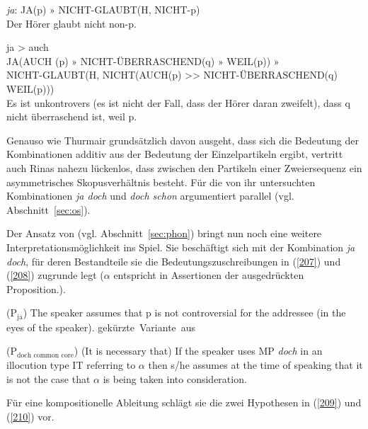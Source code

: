 \begin{exe}
	\ex\label{205} 
			\textit{ja}: JA(p) $»$ NICHT-GLAUBT(H, NICHT-p)\\
			\glq Der Hörer glaubt nicht non-p.\grq {}
\hfill\hbox{\citet[425/420]{Rinas2007}}			
\end{exe}

\begin{exe}
\ex\label{206}
	ja > auch\\
	JA(AUCH (p) $»$ NICHT-ÜBERRASCHEND(q) $»$ WEIL(p)) $»$\\
	NICHT-GLAUBT(H, NICHT(AUCH(p) >> NICHT-ÜBERRASCHEND(q) \\ WEIL(p)))\\
	\glq Es ist unkontrovers (es ist nicht der Fall, dass der Hörer daran zweifelt), dass q nicht überraschend ist, weil p.\grq {}	
	\hfill\hbox {\citet[425]{Rinas2007}}
\end{exe}
Genauso wie Thurmair grundsätzlich davon ausgeht, dass sich die Bedeutung der Kombinationen additiv aus der Bedeutung der Einzelpartikeln ergibt, vertritt auch Rinas nahezu lückenlos, dass zwischen den Partikeln einer Zweiersequenz ein asymmetrisches Skopusverhältnis besteht. Für die von ihr untersuchten Kombinationen \textit{ja doch} und \textit{doch schon} argumentiert \citet{Ormelius-Sandblom1997} paral\-lel (vgl. Abschnitt~\ref{sec:os}). 

Der Ansatz von \citet{Lindner1991} (vgl. Abschnitt~\ref{sec:phon}) bringt nun noch eine weitere Interpretationsmöglichkeit ins Spiel. Sie beschäftigt sich mit der Kombination \textit{ja doch}, für deren Bestandteile sie die Bedeutungszuschreibungen in (\ref{207}) und (\ref{208}) zugrunde legt ($\alpha$ entspricht in Assertionen  der ausgedrückten Proposition.).

\begin{exe}
	\ex\label{207} 
		($\textrm{P}_{\textrm{ja}}$) The speaker assumes that p is not controversial for the addressee (in the eyes
			of the speaker).	
		\hfill\hbox {gekürzte Variante aus \citet[178]{Lindner1991}}		
\end{exe}

\begin{exe}
	\ex\label{208} 
		($\textrm{P}_{\textrm{doch common core}}$) (It is necessary that) If the speaker uses MP \textit{doch} in an illocution type IT referring to $\alpha$ then s/he assumes at the time of speaking that it is not the case that $\alpha$ is being taken into consideration.
		\newline
		\hbox{}\hfill\hbox {\citet[190]{Lindner1991}}		
\end{exe}		
Für eine kompositionelle Ableitung schlägt sie die zwei Hypothesen in (\ref{209}) und (\ref{210}) vor.

